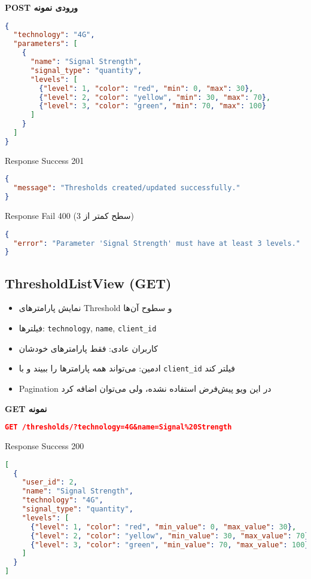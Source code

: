 \documentclass{report}
\begin{document}
\textbf{POST ورودی نمونه}
\begin{lstlisting}[language=json]
{
  "technology": "4G",
  "parameters": [
    {
      "name": "Signal Strength",
      "signal_type": "quantity",
      "levels": [
        {"level": 1, "color": "red", "min": 0, "max": 30},
        {"level": 2, "color": "yellow", "min": 30, "max": 70},
        {"level": 3, "color": "green", "min": 70, "max": 100}
      ]
    }
  ]
}
\end{lstlisting}

Response Success 201
\begin{lstlisting}[language=json]
{
  "message": "Thresholds created/updated successfully."
}
\end{lstlisting}

Response Fail 400 (سطح کمتر از 3)
\begin{lstlisting}[language=json]
{
  "error": "Parameter 'Signal Strength' must have at least 3 levels."
}
\end{lstlisting}

\subsection{ThresholdListView (GET)}
\begin{itemize}
    \item نمایش پارامترهای Threshold و سطوح آن‌ها
    \item فیلترها: \texttt{technology}, \texttt{name}, \texttt{client\_id}
    \item کاربران عادی: فقط پارامترهای خودشان
    \item ادمین: می‌تواند همه پارامترها را ببیند و با \texttt{client\_id} فیلتر کند
    \item Pagination در این ویو پیش‌فرض استفاده نشده، ولی می‌توان اضافه کرد
\end{itemize}

\textbf{GET نمونه}
\begin{lstlisting}[language=json]
GET /thresholds/?technology=4G&name=Signal%20Strength
\end{lstlisting}

Response Success 200
\begin{lstlisting}[language=json]
[
  {
    "user_id": 2,
    "name": "Signal Strength",
    "technology": "4G",
    "signal_type": "quantity",
    "levels": [
      {"level": 1, "color": "red", "min_value": 0, "max_value": 30},
      {"level": 2, "color": "yellow", "min_value": 30, "max_value": 70},
      {"level": 3, "color": "green", "min_value": 70, "max_value": 100}
    ]
  }
]
\end{lstlisting}
\end{document}
